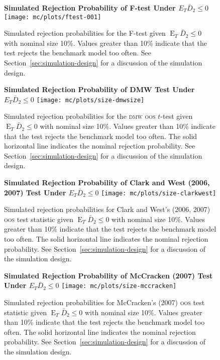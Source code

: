 \documentclass[11pt]{article}
\DeclareMathOperator{\E}{E}
\begin{document}
\begin{figure}
  \centering
  \textbf{\large{Simulated Rejection Probability of F-test Under $E_T
      \bar{D}_2 \leq 0$}}
  \texttt{[image: mc/plots/ftest-001]}
  \caption{Simulated rejection probabilities for the F-test given
    $\E_T \bar{D}_2 \leq 0$ with nominal size 10\%.  Values greater
    than 10\% indicate that the test rejects the benchmark model too
    often.  See Section~\ref{sec:simulation-design} for a discussion
    of the simulation design.}
  \label{fig:ftest}
\end{figure}
\clearpage
\begin{figure}
  \centering
  \textbf{\large{Simulated Rejection Probability of DMW Test Under $E_T
      \bar{D}_2 \leq 0$}}
  \texttt{[image: mc/plots/size-dmwsize]}  
  \caption{Simulated rejection probabilities for the \protect\textsc{dmw}
    \protect\textsc{oos} $t$-test given $\E_T \bar{D}_2 \leq 0$ with nominal
    size 10\%.  Values greater than 10\% indicate that the test
    rejects the benchmark model too often.  The solid horizontal line
    indicates the nominal rejection probability.  See
    Section~\ref{sec:simulation-design} for a discussion of the
    simulation design.}
  \label{fig:ttest-size}
\end{figure}

\begin{figure}
  \centering
  \textbf{\large{Simulated Rejection Probability of Clark and West
      (2006, 2007) Test Under $E_T \bar{D}_2 \leq 0$}}
  \texttt{[image: mc/plots/size-clarkwest]}
  \caption{Simulated rejection probabilities for Clark and West's
    (2006, 2007) \protect\textsc{oos} test statistic given $\E_T \bar{D}_2
    \leq 0$ with nominal size 10\%.  Values greater than 10\% indicate
    that the test rejects the benchmark model too often.  The solid
    horizontal line indicates the nominal rejection probability.  See
    Section~\ref{sec:simulation-design} for a discussion of the
    simulation design.}
   \label{fig:clarkwest}
\end{figure}

\begin{figure}
  \centering
  \textbf{\large{Simulated Rejection Probability of McCracken (2007)
      Test \\ Under $E_T \bar{D}_2 \leq 0$}}
  \texttt{[image: mc/plots/size-mccracken]}
  \caption{Simulated rejection probabilities for McCracken's (2007)
    \protect \textsc{oos} test statistic given $\E_T \bar{D}_2 \leq 0$ with
    nominal size 10\%.  Values greater than 10\% indicate that the
    test rejects the benchmark model too often.  The solid horizontal
    line indicates the nominal rejection probability.  See
    Section~\ref{sec:simulation-design} for a discussion of the
    simulation design.}
  \label{fig:mccracken}
\end{figure}
\end{document}

